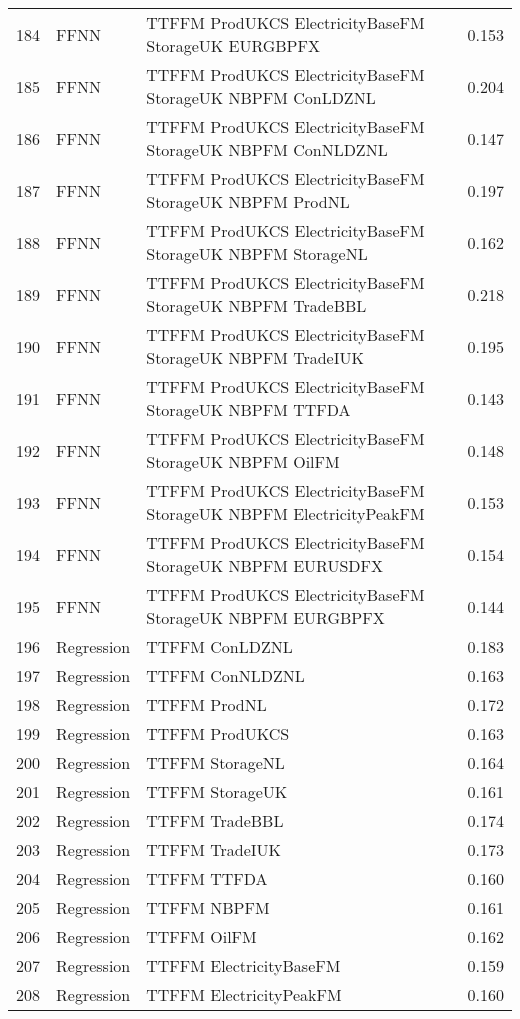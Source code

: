 \begin{table}[ht]
\begin{tabular}{rllr}
  184 & FFNN & TTFFM ProdUKCS ElectricityBaseFM StorageUK EURGBPFX & 0.153 \\ 
  185 & FFNN & TTFFM ProdUKCS ElectricityBaseFM StorageUK NBPFM ConLDZNL & 0.204 \\ 
  186 & FFNN & TTFFM ProdUKCS ElectricityBaseFM StorageUK NBPFM ConNLDZNL & 0.147 \\ 
  187 & FFNN & TTFFM ProdUKCS ElectricityBaseFM StorageUK NBPFM ProdNL & 0.197 \\ 
  188 & FFNN & TTFFM ProdUKCS ElectricityBaseFM StorageUK NBPFM StorageNL & 0.162 \\ 
  189 & FFNN & TTFFM ProdUKCS ElectricityBaseFM StorageUK NBPFM TradeBBL & 0.218 \\ 
  190 & FFNN & TTFFM ProdUKCS ElectricityBaseFM StorageUK NBPFM TradeIUK & 0.195 \\ 
  191 & FFNN & TTFFM ProdUKCS ElectricityBaseFM StorageUK NBPFM TTFDA & 0.143 \\ 
  192 & FFNN & TTFFM ProdUKCS ElectricityBaseFM StorageUK NBPFM OilFM & 0.148 \\ 
  193 & FFNN & TTFFM ProdUKCS ElectricityBaseFM StorageUK NBPFM ElectricityPeakFM & 0.153 \\ 
  194 & FFNN & TTFFM ProdUKCS ElectricityBaseFM StorageUK NBPFM EURUSDFX & 0.154 \\ 
  195 & FFNN & TTFFM ProdUKCS ElectricityBaseFM StorageUK NBPFM EURGBPFX & 0.144 \\ 
  196 & Regression & TTFFM ConLDZNL & 0.183 \\ 
  197 & Regression & TTFFM ConNLDZNL & 0.163 \\ 
  198 & Regression & TTFFM ProdNL & 0.172 \\ 
  199 & Regression & TTFFM ProdUKCS & 0.163 \\ 
  200 & Regression & TTFFM StorageNL & 0.164 \\ 
  201 & Regression & TTFFM StorageUK & 0.161 \\ 
  202 & Regression & TTFFM TradeBBL & 0.174 \\ 
  203 & Regression & TTFFM TradeIUK & 0.173 \\ 
  204 & Regression & TTFFM TTFDA & 0.160 \\ 
  205 & Regression & TTFFM NBPFM & 0.161 \\ 
  206 & Regression & TTFFM OilFM & 0.162 \\ 
  207 & Regression & TTFFM ElectricityBaseFM & 0.159 \\ 
  208 & Regression & TTFFM ElectricityPeakFM & 0.160 \\ 

\end{tabular}
\end{table}
